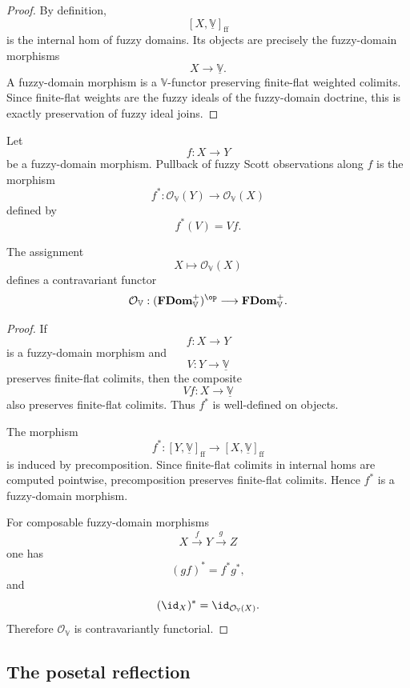 \begin{proof}
By definition,
\[
    [X,\underline{\mathbb V}]_{\mathrm{ff}}
\]
is the internal hom of fuzzy domains.  Its objects are precisely the
fuzzy-domain morphisms
\[
    X\to\underline{\mathbb V}.
\]
A fuzzy-domain morphism is a \(\mathbb V\)-functor preserving finite-flat
weighted colimits.  Since finite-flat weights are the fuzzy ideals of the
fuzzy-domain doctrine, this is exactly preservation of fuzzy ideal joins.
\end{proof}

\begin{definition}
\label{def:pullback-fuzzy-scott-observations}
Let
\[
    f:X\to Y
\]
be a fuzzy-domain morphism.  Pullback of fuzzy Scott observations along \(f\)
is the morphism
\[
    f^\ast:
    \mathcal O_{\mathbb V}(Y)\to\mathcal O_{\mathbb V}(X)
\]
defined by
\[
    f^\ast(V)=Vf.
\]
\end{definition}

\begin{proposition}
\label{prop:functoriality-fuzzy-scott-observations}
The assignment
\[
    X\longmapsto\mathcal O_{\mathbb V}(X)
\]
defines a contravariant functor
\[
    \mathcal O_{\mathbb V}:
    (\mathbf{FDom}_{\mathbb V}^{+})^{\op}
    \longrightarrow
    \mathbf{FDom}_{\mathbb V}^{+}.
\]
\end{proposition}

\begin{proof}
If
\[
    f:X\to Y
\]
is a fuzzy-domain morphism and
\[
    V:Y\to\underline{\mathbb V}
\]
preserves finite-flat colimits, then the composite
\[
    Vf:X\to\underline{\mathbb V}
\]
also preserves finite-flat colimits.  Thus \(f^\ast\) is well-defined on
objects.

The morphism
\[
    f^\ast:
    [Y,\underline{\mathbb V}]_{\mathrm{ff}}
    \to
    [X,\underline{\mathbb V}]_{\mathrm{ff}}
\]
is induced by precomposition.  Since finite-flat colimits in internal homs are
computed pointwise, precomposition preserves finite-flat colimits.  Hence
\(f^\ast\) is a fuzzy-domain morphism.

For composable fuzzy-domain morphisms
\[
    X\xrightarrow{f}Y\xrightarrow{g}Z
\]
one has
\[
    (gf)^\ast=f^\ast g^\ast,
\]
and
\[
    (\id_X)^\ast=\id_{\mathcal O_{\mathbb V}(X)}.
\]
Therefore \(\mathcal O_{\mathbb V}\) is contravariantly functorial.
\end{proof}

\subsection{The posetal reflection}
\label{subsec:fuzzy-scott-observations-posetal}

